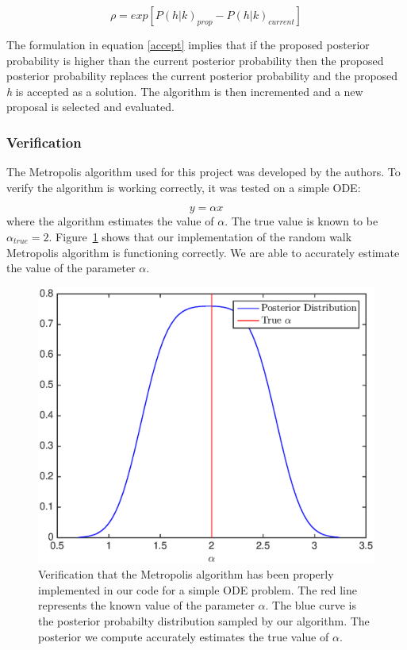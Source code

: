 \begin{equation}\label{accept}
\rho = exp[P(h|%
k)_{prop} - P(h|%
k)_{current}]
\end{equation}

The formulation in equation \ref{accept} implies that if the proposed posterior probability is higher than the current posterior probability then the proposed posterior probability replaces the current posterior probability and the proposed \textit{h} is accepted as a solution. The algorithm is then incremented and a new proposal is selected and evaluated. 


\subsubsection{Verification}
The Metropolis algorithm used for this project was developed by the authors. To verify the algorithm is working correctly, it was tested on a simple ODE:

\begin{equation}
y = \alpha x 
\end{equation}
where the algorithm estimates the value of $\alpha$. The true value is known to be $\alpha_{true}=2$. Figure~\ref{verifymcmc} shows that our implementation of the random walk Metropolis algorithm is functioning correctly. We are able to accurately estimate the value of the parameter $\alpha$. 

\begin{figure}[H]
\center
\includegraphics[scale=0.46]{img/MCMC-verification}
\caption{Verification that the Metropolis algorithm has been properly implemented in our code for a simple ODE problem. The red line represents the known value of the parameter $\alpha$. The blue curve is the posterior probabilty distribution sampled by our algorithm. The posterior we compute accurately estimates the true value of $\alpha$.}
\label{verifymcmc}
\end{figure}

